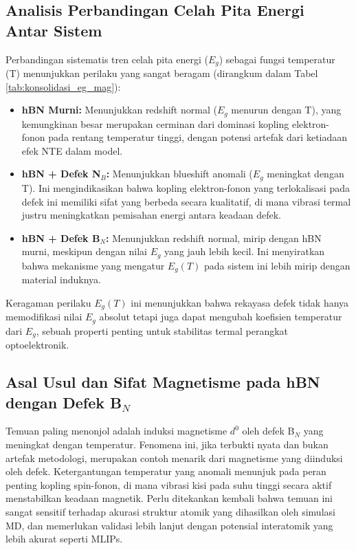 \subsection{Analisis Perbandingan Celah Pita Energi Antar Sistem}
\label{subsec:perbandingan_eg}
Perbandingan sistematis tren celah pita energi ($E_g$) sebagai fungsi temperatur (T) menunjukkan perilaku yang sangat beragam (dirangkum dalam Tabel \ref{tab:konsolidasi_eg_mag}):
\begin{itemize}
    \item \textbf{hBN Murni:} Menunjukkan redshift normal ($E_g$ menurun dengan T), yang kemungkinan besar merupakan cerminan dari dominasi kopling elektron-fonon pada rentang temperatur tinggi, dengan potensi artefak dari ketiadaan efek NTE dalam model.
    \item \textbf{hBN + Defek N$_B$:} Menunjukkan blueshift anomali ($E_g$ meningkat dengan T). Ini mengindikasikan bahwa kopling elektron-fonon yang terlokalisasi pada defek ini memiliki sifat yang berbeda secara kualitatif, di mana vibrasi termal justru meningkatkan pemisahan energi antara keadaan defek.
    \item \textbf{hBN + Defek B$_N$:} Menunjukkan redshift normal, mirip dengan hBN murni, meskipun dengan nilai $E_g$ yang jauh lebih kecil. Ini menyiratkan bahwa mekanisme yang mengatur $E_g(T)$ pada sistem ini lebih mirip dengan material induknya.
\end{itemize}
Keragaman perilaku $E_g(T)$ ini menunjukkan bahwa rekayasa defek tidak hanya memodifikasi nilai $E_g$ absolut tetapi juga dapat mengubah koefisien temperatur dari $E_g$, sebuah properti penting untuk stabilitas termal perangkat optoelektronik.

\subsection{Asal Usul dan Sifat Magnetisme pada hBN dengan Defek B$_N$}
\label{subsec:asal_magnetisme_bn}
Temuan paling menonjol adalah induksi magnetisme $d^0$ oleh defek B$_N$ yang meningkat dengan temperatur. Fenomena ini, jika terbukti nyata dan bukan artefak metodologi, merupakan contoh menarik dari magnetisme yang diinduksi oleh defek. Ketergantungan temperatur yang anomali menunjuk pada peran penting kopling spin-fonon, di mana vibrasi kisi pada suhu tinggi secara aktif menstabilkan keadaan magnetik. Perlu ditekankan kembali bahwa temuan ini sangat sensitif terhadap akurasi struktur atomik yang dihasilkan oleh simulasi MD, dan memerlukan validasi lebih lanjut dengan potensial interatomik yang lebih akurat seperti MLIPs.

